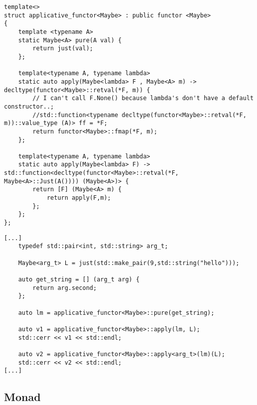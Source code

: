 \documentclass[12pt,fleqn]{article}
\begin{document}
%
%
\begin{minipage}{\linewidth}
\begin{lstlisting}[caption=AMaybe applicative functor, label=maybeapp ]
template<>
struct applicative_functor<Maybe> : public functor <Maybe>
{
	template <typename A> 
	static Maybe<A> pure(A val) {
		return just(val);
	};
	
	template<typename A, typename lambda>
	static auto apply(Maybe<lambda> F , Maybe<A> m) -> decltype(functor<Maybe>::retval(*F, m)) { 
		// I can't call F.None() because lambda's don't have a default constructor..;
		//std::function<typename decltype(functor<Maybe>::retval(*F, m))::value_type (A)> ff = *F;
		return functor<Maybe>::fmap(*F, m);
	};

	template<typename A, typename lambda>
	static auto apply(Maybe<lambda> F) -> std::function<decltype(functor<Maybe>::retval(*F, Maybe<A>::Just(A()))) (Maybe<A>)> {
		return [F] (Maybe<A> m) {
			return apply(F,m);
		};
	};
};
\end{lstlisting}
\end{minipage}
%
%
%


%
%
\begin{minipage}{\linewidth}
\begin{lstlisting}[caption=example of the maybe applicative, label=maybeappexample]
[...]
	typedef std::pair<int, std::string> arg_t;

	Maybe<arg_t> L = just(std::make_pair(9,std::string("hello")));

	auto get_string = [] (arg_t arg) {
		return arg.second;
	};

	auto lm = applicative_functor<Maybe>::pure(get_string);

	auto v1 = applicative_functor<Maybe>::apply(lm, L);
	std::cerr << v1 << std::endl;

	auto v2 = applicative_functor<Maybe>::apply<arg_t>(lm)(L);
	std::cerr << v2 << std::endl;
[...]
\end{lstlisting}
\end{minipage}
%
%
%

%
\subsection{Monad}
%
\end{document}
